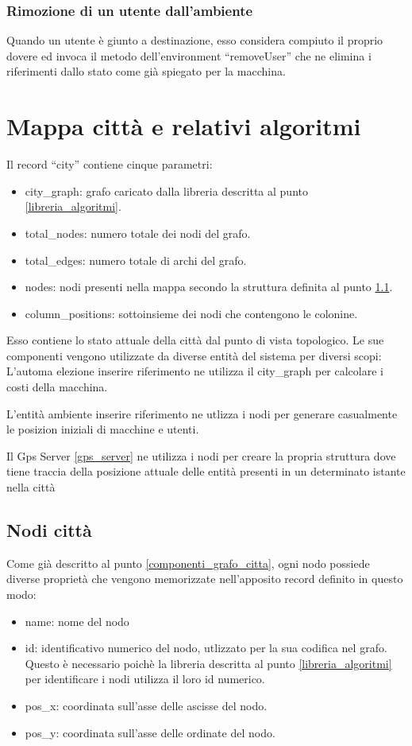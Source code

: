 \subsubsection{Rimozione di un utente dall'ambiente}
Quando un utente è giunto a destinazione, esso considera compiuto il proprio dovere ed invoca il metodo dell'environment ``removeUser'' che ne elimina i riferimenti dallo stato come già spiegato per la macchina.

\section{Mappa città e relativi algoritmi} \label{citta_e_algoritmi}
Il record ``city'' contiene cinque parametri:
\begin{itemize}
	\item city\_graph: grafo caricato dalla libreria descritta al punto \ref{libreria_algoritmi}.
	\item total\_nodes: numero totale dei nodi del grafo.
	\item total\_edges: numero totale di archi del grafo.
	\item nodes: nodi presenti nella mappa secondo la struttura definita al punto \ref{nodi_citta}.
	\item column\_positions: sottoinsieme dei nodi che contengono le colonine.
\end{itemize}

Esso contiene lo stato attuale della città dal punto di vista topologico. Le sue componenti vengono utilizzate da diverse entità del sistema per diversi scopi:
L'automa elezione inserire riferimento ne utilizza il city\_graph per calcolare i costi della macchina.

L'entità ambiente inserire riferimento ne utlizza i nodi per generare casualmente le posizion iniziali di macchine e utenti.

Il Gps Server \ref{gps_server} ne utilizza i nodi per creare la propria struttura dove tiene traccia della posizione attuale delle entità presenti in un determinato istante nella città

\subsection{Nodi città}\label{nodi_citta}
Come già descritto al punto \ref{componenti_grafo_citta}, ogni nodo possiede diverse proprietà che vengono memorizzate nell'apposito record definito in questo modo:
\begin{itemize}
	\item name: nome del nodo
	\item id: identificativo numerico del nodo, utlizzato per la sua codifica nel grafo. Questo è necessario poichè la libreria descritta al punto \ref{libreria_algoritmi} per identificare i nodi utilizza il loro id numerico.
	\item pos\_x: coordinata sull'asse delle ascisse del nodo.
	\item pos\_y: coordinata sull'asse delle ordinate del nodo.
\end{itemize}

